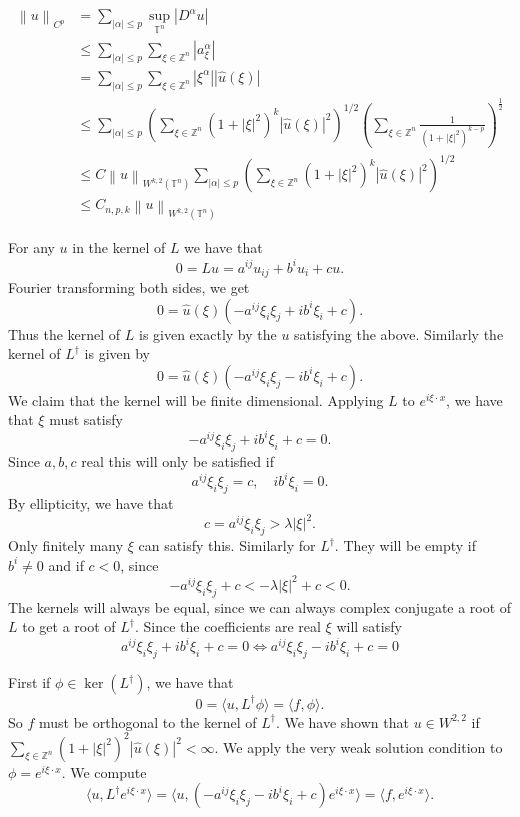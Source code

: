 \documentclass[12pt, a4paper]{article}
\theoremstyle{definition}
\newcommand{\Z}{\mathbb{Z}}                           %
\newcommand{\T}{\mathbb{T}}                         %
\newcommand{\lan}{\langle}
\newcommand{\ran}{\rangle}
\newcommand{\norm}[1]{\left\lVert#1\right\rVert}
\newcommand{\inn}[1]{\lan#1\ran}
\begin{document}
\begin{align*}
	\norm{u}_{C^p} &= \sum_{|\alpha |\leq p} \sup_{\T^n} |D^\alpha u|
	\\ & \leq \sum_{|\alpha |\leq p} \sum_{\xi \in \Z^n}|a^\alpha_\xi| \tag{part $a)$}
	\\ & = \sum_{|\alpha |\leq p} \sum_{\xi \in \Z^n} |\xi^\alpha| |\hat{u}(\xi)|
	\\ & \leq \sum_{|\alpha |\leq p}\left(\sum_{\xi \in \Z^n} (1+|\xi|^2)^k| \hat{u}(\xi)|^2 \right)^{1/2} \left( \sum_{\xi \in \Z^n} \frac{1}{(1+|\xi|^2)^{k-p}} \right)^\frac{1}{2} \tag{by above}
	\\ & \leq C \norm{u}_{W^{k,2}(\T^n)} \sum_{|\alpha |\leq p}\left(\sum_{\xi \in \Z^n} (1+|\xi|^2)^k| \hat{u}(\xi)|^2 \right)^{1/2} \tag{by $c)$}
	\\ & \leq C_{n,p,k} \norm{u}_{W^{k,2}(\T^n)}
\end{align*} 
\item For any $u$ in the kernel of $L$ we have that 
$$0 = Lu = a^{ij}u_{ij} + b^i u_i + cu.$$
Fourier transforming both sides, we get
$$0 = \hat{u}(\xi) (-a^{ij}\xi_i \xi_j + ib^i \xi_i + c).$$
Thus the kernel of $L$ is given exactly by the $u$ satisfying the above. Similarly the kernel of $L^\dagger$ is given by 
$$0 = \hat{u}(\xi) (-a^{ij}\xi_i \xi_j - ib^i \xi_i + c).$$
We claim that the kernel will be finite dimensional. Applying $L$ to $e^{i \xi \cdot x}$, we have that $\xi$ must satisfy 
$$-a^{ij}\xi_i \xi_j + ib^i \xi_i +c = 0.$$
Since $a,b,c$ real this will only be satisfied if 
$$a^{ij}\xi_i\xi_j  = c , \quad ib^i\xi_i = 0.$$
By ellipticity, we have that $$c = a^{ij}\xi_i \xi_j > \lambda |\xi|^2.$$
Only finitely many $\xi$ can satisfy this. Similarly for $L^\dagger$. 
They will be empty if $b^i \neq 0$ and if $c < 0$, since 
$$-a^{ij} \xi_i \xi_j + c < -\lambda |\xi|^2 + c <0.$$
The kernels will always be equal, since we can always complex conjugate a root of $L$ to get a root of $L^\dagger$. Since the coefficients are real $\xi$ will satisfy
$$a^{ij}\xi_i \xi_j + ib^i \xi_i +c = 0 \iff a^{ij}\xi_i \xi_j - ib^i \xi_i +c = 0$$
\item First if $\phi \in \ker (L^\dagger)$, we have that 
$$0 = \inn{u, L^\dagger \phi} = \inn{f , \phi}. $$
So $f$ must be orthogonal to the kernel of $L^\dagger$. We have shown that $u\in W^{2,2}$ if $\sum_{\xi \in \Z^n} (1+|\xi|^2)^2 |\hat{u}(\xi)|^2 < \infty$. We apply the very weak solution condition to $\phi = e^{i \xi \cdot x}$. We compute 
$$\inn{u, L^\dagger e^{i \xi \cdot x}} = \inn{u, (-a^{ij} \xi_i \xi_j - i b^i \xi_i +c) e^{i \xi \cdot x}} = \inn{f, e^{i \xi \cdot x}}. $$
\end{document}
